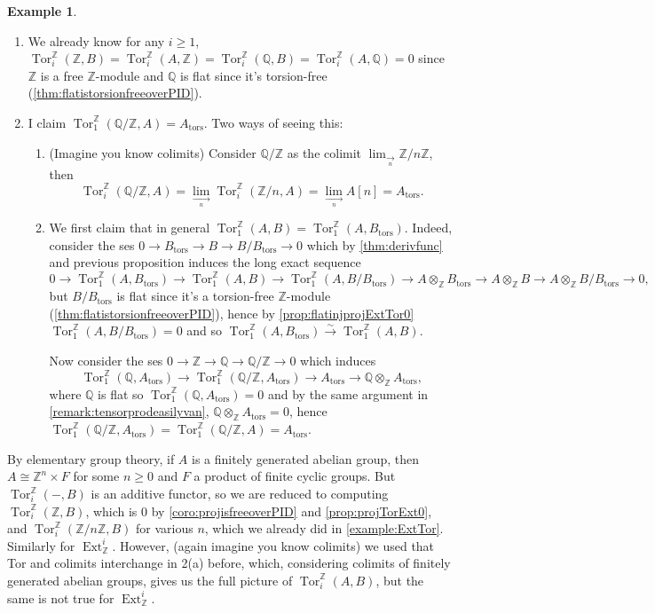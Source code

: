 \documentclass{article}
\newcommand{\Z}{\mathbb{Z}}
\newcommand{\Q}{\mathbb{Q}}
\newcommand{\tors}{{\operatorname{tors}}}
\newcommand{\Tor}{\operatorname{Tor}}
\newcommand{\Ext}{\operatorname{Ext}}
\theoremstyle{definition}
\newtheorem{example}[defn]{Example}
\begin{document}
\begin{example}
\begin{enumerate}
\item We already know for any $i\geq 1$, $\Tor_i^\Z(\Z,B)=\Tor_i^\Z(A,\Z)=\Tor_i^\Z(\Q,B)=\Tor_i^\Z(A,\Q)=0$ since $\Z$ is a free $\Z$-module and $\Q$ is flat since it's torsion-free (\ref{thm:flatistorsionfreeoverPID}).
\item I claim $\Tor_1^\Z(\Q/\Z,A)=A_\tors$. Two ways of seeing this:
\begin{enumerate}
\item (Imagine you know colimits) Consider $\Q/\Z$ as the colimit $\displaystyle\lim_{\underset{n}{\rightarrow}}\Z/n\Z$, then
\[
\Tor_i^\Z(\Q/\Z,A)=\underset{\underset{n}{\rightarrow}}{\lim}\Tor_i^\Z(\Z/n,A)=\underset{\underset{n}{\rightarrow}}{\lim}A[n]=A_\tors.
\]
\item We first claim that in general $\Tor_1^\Z(A,B)=\Tor_1^\Z(A,B_\tors)$. Indeed, consider the ses $0\rightarrow B_\tors\rightarrow B\rightarrow B/B_\tors \rightarrow 0$ which by \ref{thm:derivfunc} and previous proposition induces the long exact sequence
\[
0\rightarrow \Tor_1^\Z(A,B_\tors) \rightarrow \Tor_1^\Z(A,B) \rightarrow\Tor_1^\Z(A,B/B_\tors) \rightarrow A\otimes_\Z B_\tors \rightarrow A\otimes_\Z B\rightarrow A\otimes_\Z B/B_\tors \rightarrow 0,
\]
but $B/B_\tors$ is flat since it's a torsion-free $\Z$-module (\ref{thm:flatistorsionfreeoverPID}), hence by \ref{prop:flatinjprojExtTor0} $\Tor_1^\Z(A,B/B_\tors)=0$ and so $\Tor_1^\Z(A,B_\tors) \xrightarrow{\sim} \Tor_1^\Z(A,B)$.

Now consider the ses $0\rightarrow\Z\rightarrow\Q\rightarrow\Q/\Z\rightarrow 0$ which induces
\[
\Tor_1^\Z(\Q,A_\tors)\rightarrow\Tor_1^\Z(\Q/\Z,A_\tors)\rightarrow A_\tors\rightarrow \Q\otimes_\Z A_\tors,
\]
where $\Q$ is flat so $\Tor_1^\Z(\Q,A_\tors)=0$ and by the same argument in \ref{remark:tensorprodeasilyvan}, $\Q\otimes_\Z A_\tors=0$, hence $\Tor_1^\Z(\Q/\Z,A_\tors)=\Tor_1^\Z(\Q/\Z,A)=A_\tors$.
\end{enumerate}
\end{enumerate}
\end{example}

By elementary group theory, if $A$ is a finitely generated abelian group, then $A\cong\Z^n\times F$ for some $n\geq 0$ and $F$ a product of finite cyclic groups. But $\Tor_i^\Z(-,B)$ is an additive functor, so we are reduced to computing $\Tor_i^\Z(\Z,B)$, which is 0 by \ref{coro:projisfreeoverPID} and \ref{prop:projTorExt0}, and $\Tor_i^\Z(\Z/n\Z,B)$ for various $n$, which we already did in \ref{example:ExtTor}. Similarly for $\Ext_\Z^i$. However, (again imagine you know colimits) we used that Tor and colimits interchange in 2(a) before, which, considering colimits of finitely generated abelian groups, gives us the full picture of $\Tor_i^\Z(A,B)$, but the same is not true for $\Ext_\Z^i$.
\end{document}
